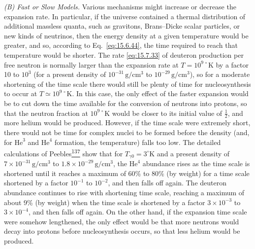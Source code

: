 \emph{(B) Fast or Slow Models.} Various mechanisms might increase or
decrease the expansion rate. In particular, if the universe contained a
thermal distribution of additional massless quanta, such as gravitons,
Brans--Dicke scalar particles, or new kinds of neutrinos, then the energy
density at a given temperature would be greater, and so, according to
Eq.~\eqref{eq:15.6.44}, the time required to reach that temperature would be
shorter. The rate \eqref{eq:15.7.33} of deuteron production per free neutron
is normally larger than the expansion rate at
\(T=10^{9\,\circ}\mathrm K\) by a factor 10 to \(10^3\) (for a present
density of \(10^{-31}\,\mathrm{g/cm^3}\) to
\(10^{-29}\,\mathrm{g/cm^3}\)), so for a moderate shortening of the time
scale there would still be plenty of time for nucleosynthesis to occur at
\(T\simeq10^{9\,\circ}\mathrm K\). In this case, the only effect of the
faster expansion would be to cut down the time available for the conversion
of neutrons into protons, so that the neutron fraction at
\(10^{9\,\circ}\mathrm K\) would be closer to its initial value of
\(\tfrac12\), and more helium would be produced. However, if the time scale
were extremely short, there would not be time for complex nuclei to be formed
before the density (and, for \(\mathrm{He}^3\) and \(\mathrm{He}^4\)
formation, the temperature) falls too low. The detailed calculations of
Peebles\hyperref[ch15-ref-137]{\textsuperscript{137}} show that for
\(T_{\gamma0}=3^\circ\mathrm K\) and a present density of
\(7\times10^{-31}\,\mathrm{g/cm^3}\) to
\(1.8\times10^{-29}\,\mathrm{g/cm^3}\), the \(\mathrm{He}^4\) abundance
rises as the time scale is shortened until it reaches a maximum of 60\% to
80\% (by weight) for a time scale shortened by a factor \(10^{-1}\) to
\(10^{-2}\), and then falls off again. The deuteron abundance continues to
rise with shortening time scale, reaching a maximum of about 9\% (by weight)
when the time scale is shortened by a factor \(3\times10^{-3}\) to
\(3\times10^{-4}\), and then falls off again. On the other hand, if the
expansion time scale were somehow lengthened, the only effect would be that
more neutrons would decay into protons before nucleosynthesis occurs, so that
less helium would be produced.

